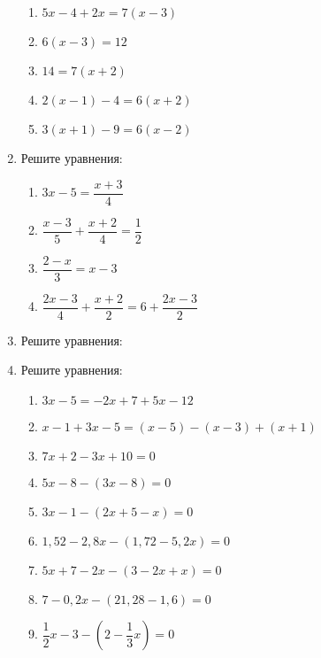 \documentclass[10pt, a4paper]{article}
\begin{document}
\begin{enumerate}
\begin{multicols}{2}
\begin{enumerate}[label=\asbuk*)]
			\item $5x-4+2x=7(x-3)$
			\item $6(x-3)=12$
			\item $14=7(x+2)$
			\item $2(x-1)-4=6(x+2)$
			\item $3(x+1)-9=6(x-2)$
		\end{enumerate}
	\end{multicols}
	\item Решите уравнения:
	\begin{multicols}{2}
		\begin{enumerate}[label=\asbuk*)]
			\item $3x-5=\dfrac{x+3}{4}$
			\item $\dfrac{x-3}{5}+\dfrac{x+2}{4}=\dfrac{1}{2}$
			\item $\dfrac{2-x}{3}=x-3$
			\item $\dfrac{2x-3}{4}+\dfrac{x+2}{2}=6+\dfrac{2x-3}{2}$
		\end{enumerate}
	\end{multicols}
	\item Решите уравнения:
	\begin{enumerate}[label=\asbuk*)]
	\end{enumerate}
	\item Решите уравнения:
	\begin{enumerate}[label=\asbuk*)]
		\item $3x-5=-2x+7+5x-12$
		\item $x-1+3x-5=(x-5)-(x-3)+(x+1)$
		\item $7x+2-3x+10=0$
		\item $5x-8-(3x-8)=0$
		\item $3x-1-(2x+5-x)=0$
		\item $1,52-2,8x-(1,72-5,2x)=0$
		\item $5x+7-2x-(3-2x+x)=0$
		\item $7-0,2x-(21,28-1,6)=0$
		\item $\dfrac{1}{2}x-3-\left(2-\dfrac{1}{3}x\right)=0$

\end{enumerate}
\end{enumerate}
\end{document}
